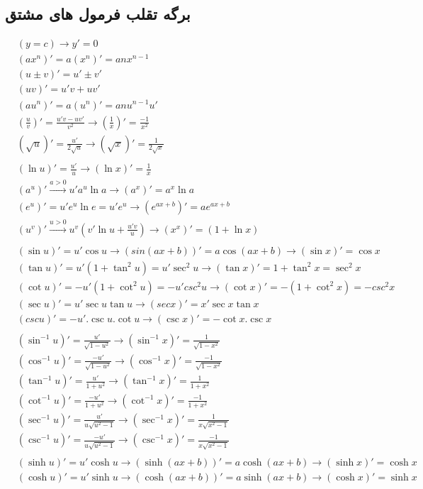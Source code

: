 \newpage
\subsection{برگه تقلب فرمول های مشتق}
\begin{align*}
&(y = c) \longrightarrow y' = 0 \\
&(ax^n)' = a(x^n)' = anx^{n-1} \\
&(u \pm v)' = u' \pm v' \\
&(uv)' = u'v + uv' \\
&(au^n)' = a(u^n)' = anu^{n-1}u' \\
&(\frac{u}{v})' = \frac{u'v - uv'}{v^2} \longrightarrow (\frac{1}{x})' = \frac{-1}{x^2} \\
&(\sqrt{u})' = \frac{u'}{2\sqrt{u}} \longrightarrow (\sqrt{x})' = \frac{1}{2\sqrt{x}} \\
\\
&(\ln u)' = \frac{u'}{u} \longrightarrow (\ln x)' = \frac{1}{x}  \\
&(a^u)' \overset{a>0}{\longrightarrow} u'a^u\ln a \longrightarrow (a^x)' = a^x\ln a \\
&(e^u)' = u'e^u\ln e = u'e^u \longrightarrow (e^{ax+b})' = ae^{ax+b} \\
&(u^v)' \overset{u>0}{\longrightarrow} u^v(v'\ln u+\frac{u'v}{u}) \longrightarrow (x^x)' = (1 + \ln x) \\
\\
&(\sin u)' = u'\cos u \longrightarrow (sin(ax+b))' = a \cos(ax+b) \longrightarrow (\sin x)' = \cos x \\
&(\tan u)' = u'(1+\tan^2u) = u'\sec^2u \longrightarrow (\tan x)' = 1+\tan^2 x = \sec^2 x \\
&(\cot u)' = -u'(1+\cot^2u) = -u'csc^2u \longrightarrow (\cot x)' = -(1+\cot^2x) = -csc^2x \\
&(\sec u)' = u'\sec u \tan u \longrightarrow (sec x)' = x'\sec x\tan x \\
&(csc u)' = -u'.\csc u.\cot u \longrightarrow (\csc x)' = -\cot x.\csc x \\
\\
&(\sin^{-1} u)' = \frac{u'}{\sqrt{1-u^2}} \longrightarrow (\sin^{-1}x)' = \frac{1}{\sqrt{1-x^2}} \\
&(\cos^{-1} u)' = \frac{-u'}{\sqrt{1-u^2}} \longrightarrow (\cos^{-1}x)' = \frac{-1}{\sqrt{1-x^2}} \\
&(\tan^{-1} u)' = \frac{u'}{1+u^2} \longrightarrow (\tan^{-1}x)' = \frac{1}{1+x^2} \\
&(\cot^{-1} u)' = \frac{-u'}{1+u^2} \longrightarrow (\cot^{-1}x)' = \frac{-1}{1+x^2} \\
&(\sec^{-1}u)' = \frac{u'}{u\sqrt{u^2-1}} \longrightarrow (\sec^{-1}x)' = \frac{1}{x\sqrt{x^2-1}} \\
&(\csc^{-1}u)' = \frac{-u'}{u\sqrt{u^2-1}} \longrightarrow (\csc^{-1}x)' = \frac{-1}{x\sqrt{x^2-1}} \\
\\
&(\sinh u)' = u'\cosh u \longrightarrow (\sinh(ax+b))' = a\cosh(ax+b) \longrightarrow (\sinh x)' = \cosh x \\
&(\cosh u)' = u'\sinh u \longrightarrow (\cosh(ax+b))' = a\sinh(ax+b) \longrightarrow (\cosh x)' = \sinh x  \\
\end{align*}
